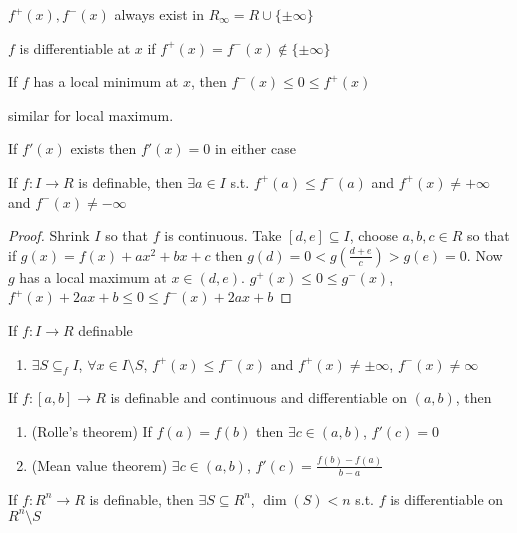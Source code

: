 \documentclass[11pt]{article}
\begin{document}
\(f^+(x),f^-(x)\) always exist in \(R_\infty=R\cup\{\pm\infty\}\)

\(f\) is differentiable at \(x\) if \(f^+(x)=f^-(x)\not\in\{\pm\infty\}\)

\begin{lemma}[]
If \(f\) has a local minimum at \(x\), then \(f^-(x)\le 0\le f^+(x)\)

similar for local maximum.

If \(f'(x)\) exists then \(f'(x)=0\) in either case
\end{lemma}

\begin{lemma}[]
If \(f:I\to R\) is definable, then \(\exists a\in I\) s.t. \(f^+(a)\le f^-(a)\) and \(f^+(x)\neq+\infty\) and \(f^-(x)\neq-\infty\)
\end{lemma}

\begin{proof}
Shrink \(I\) so that \(f\) is continuous. Take \([d,e]\subseteq I\), choose \(a,b,c\in R\) so that
if \(g(x)=f(x)+ax^2+bx+c\) then \(g(d)=0<g(\frac{d+e}{c})>g(e)=0\).
Now \(g\) has a local maximum at \(x\in(d,e)\). \(g^+(x)\le 0\le g^-(x)\), \(f^+(x)+2ax+b\le 0\le f^-(x)+2ax+b\)
\end{proof}

\begin{theorem}[]
If \(f:I\to R\) definable
\begin{enumerate}
\item \(\exists S\subseteq_fI\), \(\forall x\in I\setminus S\), \(f^+(x)\le f^-(x)\) and \(f^+(x)\neq\pm\infty\), \(f^-(x)\neq\infty\)
\end{enumerate}
\end{theorem}

\begin{theorem}[]
If \(f:[a,b]\to R\) is definable and continuous and differentiable on \((a,b)\), then
\begin{enumerate}
\item (Rolle's theorem) If \(f(a)=f(b)\) then \(\exists c\in(a,b)\), \(f'(c)=0\)
\item (Mean value theorem) \(\exists c\in(a,b)\), \(f'(c)=\frac{f(b)-f(a)}{b-a}\)
\end{enumerate}
\end{theorem}

\begin{theorem}[]
If \(f:R^n\to R\) is definable, then \(\exists S\subseteq R^n\), \(\dim(S)<n\) s.t. \(f\) is differentiable
on \(R^n\setminus S\)
\end{theorem}
\end{document}
